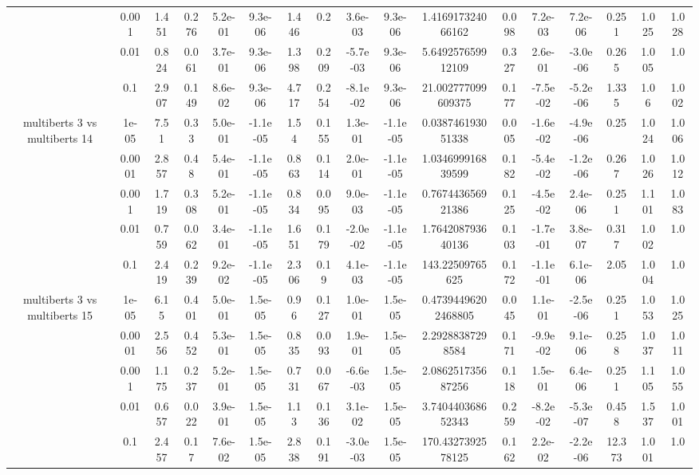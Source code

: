 \begin{tabular}{|c|c|c|c|c|c|c|c|c|c|c|c|c|c|c|c|c|}
 & 0.001 & 1.451 & 0.276 & 5.2e-01 & 9.3e-06 & 1.446 & 0.2 & 3.6e-03 & 9.3e-06 & 1.416917324066162 & 0.098 & 7.2e-03 & 7.2e-06 & 0.251 & 1.025 & 1.028 \\
 & 0.01 & 0.824 & 0.061 & 3.7e-01 & 9.3e-06 & 1.398 & 0.209 & -5.7e-03 & 9.3e-06 & 5.649257659912109 & 0.327 & 2.6e-01 & -3.0e-06 & 0.265 & 1.005 & 1.0 \\
 & 0.1 & 2.907 & 0.149 & 8.6e-02 & 9.3e-06 & 4.717 & 0.254 & -8.1e-02 & 9.3e-06 & 21.002777099609375 & 0.177 & -7.5e-02 & -5.2e-06 & 1.335 & 1.06 & 1.002 \\
\hline
\multirow{5}{*}{multiberts 3 vs multiberts 14} & 1e-05 & 7.51 & 0.33 & 5.0e-01 & -1.1e-05 & 1.54 & 0.155 & 1.3e-01 & -1.1e-05 & 0.038746193051338 & 0.005 & -1.6e-02 & -4.9e-06 & 0.25 & 1.024 & 1.006 \\
 & 0.0001 & 2.857 & 0.48 & 5.4e-01 & -1.1e-05 & 0.863 & 0.114 & 2.0e-01 & -1.1e-05 & 1.034699916839599 & 0.182 & -5.4e-02 & -1.2e-06 & 0.267 & 1.026 & 1.012 \\
 & 0.001 & 1.719 & 0.308 & 5.2e-01 & -1.1e-05 & 0.834 & 0.095 & 9.0e-03 & -1.1e-05 & 0.767443656921386 & 0.125 & -4.5e-02 & 2.4e-06 & 0.251 & 1.101 & 1.083 \\
 & 0.01 & 0.759 & 0.062 & 3.4e-01 & -1.1e-05 & 1.651 & 0.179 & -2.0e-02 & -1.1e-05 & 1.764208793640136 & 0.103 & -1.7e-01 & 3.8e-07 & 0.317 & 1.002 & 1.0 \\
 & 0.1 & 2.419 & 0.239 & 9.2e-02 & -1.1e-05 & 2.306 & 0.19 & 4.1e-03 & -1.1e-05 & 143.22509765625 & 0.172 & -1.1e-01 & 6.1e-06 & 2.05 & 1.004 & 1.0 \\
\hline
\multirow{5}{*}{multiberts 3 vs multiberts 15} & 1e-05 & 6.15 & 0.401 & 5.0e-01 & 1.5e-05 & 0.96 & 0.127 & 1.0e-01 & 1.5e-05 & 0.47394496202468805 & 0.045 & 1.1e-01 & -2.5e-06 & 0.251 & 1.053 & 1.025 \\
 & 0.0001 & 2.556 & 0.452 & 5.3e-01 & 1.5e-05 & 0.835 & 0.093 & 1.9e-01 & 1.5e-05 & 2.29288387298584 & 0.171 & -9.9e-02 & 9.1e-06 & 0.258 & 1.037 & 1.011 \\
 & 0.001 & 1.175 & 0.237 & 5.2e-01 & 1.5e-05 & 0.731 & 0.067 & -6.6e-03 & 1.5e-05 & 2.086251735687256 & 0.118 & 1.5e-01 & 6.4e-06 & 0.251 & 1.105 & 1.055 \\
 & 0.01 & 0.657 & 0.022 & 3.9e-01 & 1.5e-05 & 1.13 & 0.136 & 3.1e-02 & 1.5e-05 & 3.740440368652343 & 0.259 & -8.2e-02 & -5.3e-07 & 0.458 & 1.537 & 1.001 \\
 & 0.1 & 2.457 & 0.17 & 7.6e-02 & 1.5e-05 & 2.838 & 0.191 & -3.0e-03 & 1.5e-05 & 170.4327392578125 & 0.162 & 2.2e-02 & -2.2e-06 & 12.373 & 1.001 & 1.0 \\

\end{tabular}
